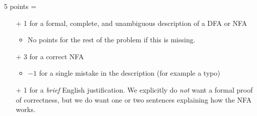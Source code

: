 \documentclass[11pt]{article}
\begin{document}
\begin{enumerate}
\begin{rubric}
5 points = 
\begin{itemize}\cramped
\item[+] 1 for a formal, complete, and unambiguous description of a DFA or NFA
\begin{itemize}\cramped
\item No points for the rest of the problem if this is missing.
\end{itemize}
\item[+] 3 for a correct NFA 
\begin{itemize}\cramped
\item $-1$ for a single mistake in the description (for example a typo)
\end{itemize}
\item[+] 1 for a \emph{brief} English justification.  We explicitly do \emph{not} want a formal proof of correctness, but we do want one or two sentences explaining how the NFA works.
\end{itemize}
\end{rubric}





\end{enumerate}
\end{document}
